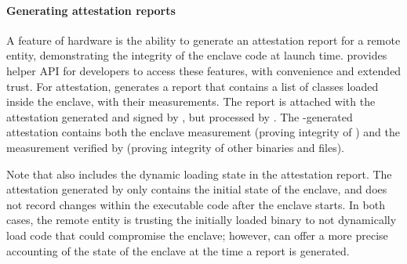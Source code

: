 

\label{sec:concept:others}

\paragraph{Generating attestation reports}
A feature of \sgx{} hardware is the ability to generate an attestation report for a remote entity,
demonstrating the integrity of the enclave code at launch time.
\sysname{} provides helper API for developers to access these features,
with convenience and extended trust.
For attestation, \sysname{} generates a report that contains a list of classes loaded inside the enclave, with their measurements.
The report is attached with the attestation generated and signed by \sgx{}, but processed by \graphene{}.
The \sgx{}-generated attestation contains both
the enclave measurement (proving integrity of \sgx{}) and
the measurement verified by \sgx{} (proving integrity of other binaries and files).



Note that \sysname{} also includes
the dynamic loading state in the attestation report.
The attestation generated by \sgx{} only contains
the initial state of the enclave, and does not record changes within the executable code
after the enclave starts. 
In both cases, the remote entity is trusting the initially loaded binary
to not dynamically load code that could compromise the enclave;
however, \sysname{} can offer a more precise accounting of the state of the enclave 
at the time a report is generated.

